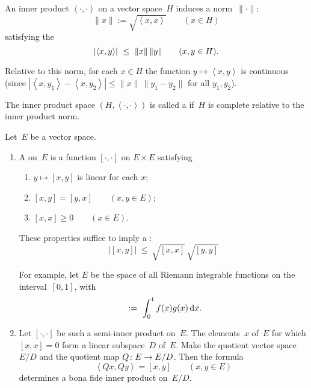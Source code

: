 \documentclass[main.tex]{subfiles}
\begin{document}
\begin{psec}{5.2}%
An inner product $\left<\cdot,\cdot\right>$
on a vector space~$H$
induces a norm~$\|\cdot\|$:
\begin{equation*}
\|x\|:=\sqrt{\left<x,x\right>}\qquad(x\in H)
\end{equation*}
satisfying the 
\begin{equation*}
\left|\left<x,y\right>\right| \ \leq\ \|x\|\,\|y\|\qquad(x,y\in H)\htam{.}
\end{equation*}

Relative to this norm,
for each $x\in H$
the function $y\mapsto \left<x,y\right>$ is continuous
(since $\left|\left<x,y_1\right>-\left<x,y_2\right>\right|
\leq\|x\|\,\|y_1 - y_2\|$ for all $y_1,y_2$).

The inner product space $(H,\left<\cdot,\cdot\right>)$ 
is called a 
if~$H$ is complete relative to the inner product norm.
\end{psec}
%
%
\begin{psec}{5.3}%
Let~$E$ be a vector space.
\begin{enumerate}%
\item\label{5.3-1}%
A  on~$E$ is a function $[\cdot,\cdot]$
on $E\times E$ satisfying
\begin{enumerate}[label={},itemindent=2em,labelindent=2em]
\item $y\mapsto [x,y]$ is linear for each $x$;
\item $[x,y]=[y,x]\qquad(x,y\in E)$;
\item $[x,x]\geq 0\qquad(x\in E)$.
\end{enumerate}
These properties suffice to 
imply a :
\begin{equation*}
|[x,y]|\ \leq\ \sqrt{[x,x]}\,\sqrt{[y,y]}
\end{equation*}

For example,
let $E$ be the space of all Riemann integrable functions
on the interval~$[0,1]$, with
\begin{equation*}
[f,g]\ :=\ \int_0^1 f(x)g(x)\,\mathrm{d}x\htam{.}
\end{equation*}
%
\item \label{5.3-2}
Let $[\cdot,\cdot]$ be such a semi-inner product on~$E$.
The elements~$x$ of~$E$ for which $[x,x]=0$
form a linear subspace~$D$ of~$E$.
Make the quotient vector space~$E/D$
and the quotient map $Q\colon E\rightarrow E/D$.
Then the formula
\begin{equation*}
\left< Qx,Qy \right> = [x,y]\qquad (x,y\in E)
\end{equation*}
determines a bona fide inner product on~$E/D$.
\end{enumerate}
\end{psec}
\end{document}
